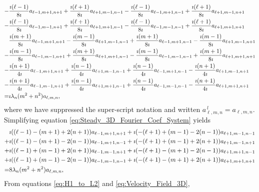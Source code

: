 \documentclass[11pt]{amsart}
\begin{document}
\begin{align}\label{eq:Steady_3D_Fourier_Coef_System}
-&\frac{\imath(\ell-1)}{8\imath}a_{\ell-1,m+1,n+1}+\frac{\imath(\ell+1)}{8\imath}a_{\ell+1,m-1,n-1}
 -\frac{\imath(\ell-1)}{8\imath}a_{\ell-1,m+1,n-1}+\frac{\imath(\ell+1)}{8\imath}a_{\ell+1,m-1,n+1}\notag\\
 -&\frac{\imath(\ell-1)}{8\imath}a_{\ell-1,m-1,n+1}+\frac{\imath(\ell+1)}{8\imath}a_{\ell+1,m+1,n-1}
  -\frac{\imath(\ell-1)}{8\imath}a_{\ell-1,m-1,n-1}+\frac{\imath(\ell+1)}{8\imath}a_{\ell+1,m+1,n+1}
\notag\\
&\frac{\imath(m+1)}{8\imath}a_{\ell-1,m+1,n+1}-\frac{\imath(m-1)}{8\imath}a_{\ell+1,m-1,n-1}
  +\frac{\imath(m+1)}{8\imath}a_{\ell-1,m+1,n-1}-\frac{\imath(m-1)}{8\imath}a_{\ell+1,m-1,n+1}\notag\\
 -&\frac{\imath(m-1)}{8\imath}a_{\ell-1,m-1,n+1}+\frac{\imath(m+1)}{8\imath}a_{\ell+1,m+1,n-1}
  -\frac{\imath(m-1)}{8\imath}a_{\ell-1,m-1,n-1}+\frac{\imath(m+1)}{8\imath}a_{\ell+1,m+1,n+1}
\notag\\
-&\frac{\imath(n+1)}{4\imath}a_{\ell-1,m+1,n+1}+\frac{\imath(n-1)}{4\imath}a_{\ell+1,m-1,n-1}
  +\frac{\imath(n-1)}{4\imath}a_{\ell-1,m+1,n-1}-\frac{\imath(n+1)}{4\imath}a_{\ell+1,m-1,n+1}\notag\\
 -&\frac{\imath(n+1)}{4\imath}a_{\ell-1,m-1,n+1}+\frac{\imath(n-1)}{4\imath}a_{\ell+1,m+1,n-1}
  +\frac{\imath(n-1)}{4\imath}a_{\ell-1,m-1,n-1}-\frac{\imath(n+1)}{4\imath}a_{\ell+1,m+1,n+1}
\notag\\
=&\imath\lambda_n(m^2+n^2)a_{\ell,m,n},
\end{align}
%
where we have suppressed the super-script notation and written
$a^{\,l}_{\ell,m,n}=a_{\ell,m,n}$. Simplifying equation
\eqref{eq:Steady_3D_Fourier_Coef_System} yields
%
\begin{align}\label{eq:Steady_3D_Fourier_Coef_System_Simp}
 &\imath((\ell-1)-(m+1)+2(n+1))a_{\ell-1,m+1,n+1}+\imath(-(\ell+1)+(m-1)-2(n-1))a_{\ell+1,m-1,n-1}\notag\\
+&\imath((\ell-1)-(m+1)-2(n-1))a_{\ell-1,m+1,n-1}+\imath(-(\ell+1)+(m-1)+2(n+1))a_{\ell+1,m-1,n+1}\notag\\
+&\imath((\ell-1)+(m-1)+2(n+1))a_{\ell-1,m-1,n+1}+\imath(-(\ell+1)-(m+1)-2(n-1))a_{\ell+1,m+1,n-1}\notag\\
+&\imath((\ell-1)+(m-1)-2(n-1))a_{\ell-1,m-1,n-1}+\imath(-(\ell+1)-(m+1)+2(n+1))a_{\ell+1,m+1,n+1}\notag\\
=&8\lambda_n(m^2+n^2)a_{\ell,m,n},
\end{align}
%
From equations \eqref{eq:H1_to_L2} and \eqref{eq:Velocity_Field_3D},
\end{document}
